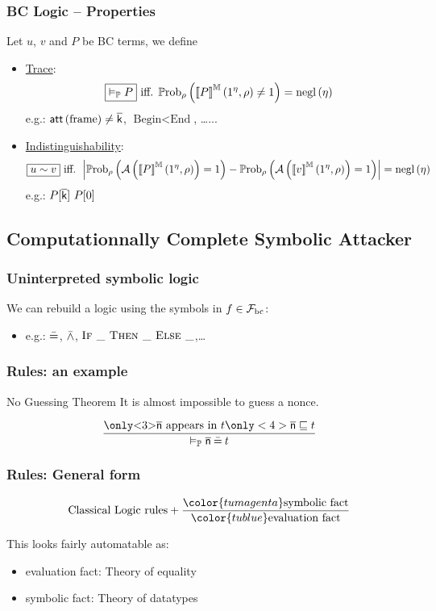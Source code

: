 \documentclass[aspectratio=169]{beamer}
\begin{document}
\begin{frame}
  \frametitle{BC Logic -- Properties}

  Let $u$, $v$ and $P$ be BC terms, we define

  \begin{itemize}
    \item \underline{Trace}:
  \[\boxed{\validp P} \text{ iff. }\mprob\left( \mevalbc{P}\left( 1^\eta, \rho \right) \neq 1 \right)=\mnegl\left( \eta \right)\]
  e.g.: $\operatorname{\mathsf{att}}\left( \text{frame} \right)\neq \overline{\mathsf{k}}$, $\text{Begin} < \text{End}$, \dots...
%
    \item \underline{Indistinguishability}:
  \[\boxed{u \sim v} \text{ iff. }\left|\mprob\left( \AAA\left( \mevalbc{P}\left( 1^\eta, \rho \right) \right) = 1 \right) - \mprob\left( \AAA\left( \mevalbc{v}\left( 1^\eta, \rho \right) \right) = 1 \right)\right|=\mnegl\left( \eta \right)\]
  e.g.: $P[\overline{\mathsf{k}}]~P[0]$
  \end{itemize}
\end{frame}

\subsection{Computationnally Complete Symbolic Attacker}

\begin{frame}
  \frametitle{Uninterpreted symbolic logic}

  We can rebuild a logic using the symbols in $f\in\mathcal{F}_\mathrm{bc}$:
  \begin{itemize}
    \item e.g.: $ \mathbin{\bar{=}} $, $\mathbin{\bar{\wedge}}$, $\textsc{If } \_ \allowbreak\textsc{ Then } \_ \allowbreak\textsc{ Else } \_$,\dots
  \end{itemize}

\end{frame}

\begin{frame}
  \frametitle{Rules: an example}\pause

  \begin{mtheoremenv}{No Guessing Theorem}{}
    It is almost impossible to guess a nonce.
  \end{mtheoremenv}\pause

  \[
    \frac{\text{\only<3>{$\n$ appears in $t$}} \only<4>{\n\sqsubseteq t}}{\validp \n \beq t}
  \]

\end{frame}

\begin{frame}
  \frametitle{Rules: General form}

  \[
    \text{Classical Logic rules} +
    \frac{\color{tumagenta} \text{symbolic fact}}{\color{tublue} \text{evaluation fact}}
  \] \pause

  This looks fairly automatable as:\pause
  \begin{itemize}
    \item {\color{tublue} evaluation fact}: Theory of equality\pause
    \item {\color{tumagenta} symbolic fact}: Theory of datatypes
  \end{itemize}

\end{frame}
\end{document}
